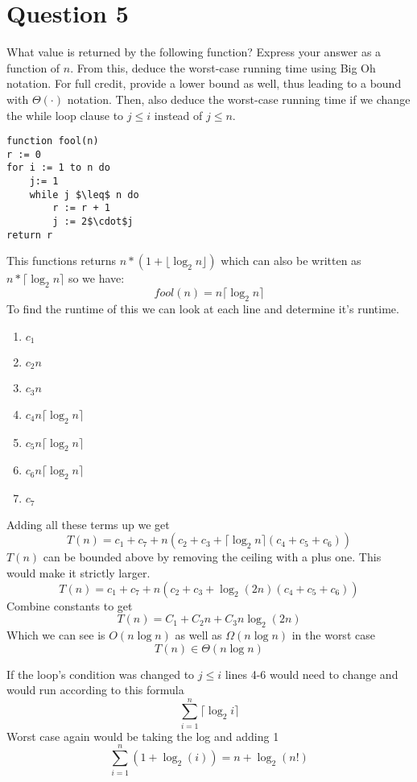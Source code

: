 \documentclass{article}
\begin{document}
\section*{Question 5}
What value is returned by the following function? Express your answer as a function of $n$.
From this, deduce the worst-case running time using Big Oh notation.
For full credit, provide a lower bound as well, thus leading to a bound with $\Theta(\cdot)$ notation.
Then, also deduce the worst-case running time if we change the while loop clause to $j \leq i$ instead of $j \leq n$.
\begin{lstlisting}
function fool(n)
r := 0
for i := 1 to n do
    j:= 1
    while j $\leq$ n do
        r := r + 1
        j := 2$\cdot$j
return r
\end{lstlisting}

This functions returns $n*(1+\lfloor \log_{2}n \rfloor)$ which can also be written as $n*\lceil \log_{2}n \rceil$ so we have:
$$fool(n)=n\lceil \log_{2}n \rceil$$
To find the runtime of this we can look at each line and determine it's runtime.

\begin{enumerate}

\item $c_{1}$
\item $c_{2}n$
\item $c_{3}n$
\item $c_{4}n\lceil \log_{2}n \rceil$
\item $c_{5}n\lceil \log_{2}n \rceil$
\item $c_{6}n\lceil \log_{2}n \rceil$
\item $c_{7}$

\end{enumerate}
Adding all these terms up we get
$$T(n) = c_{1}+c_{7} + n(c_{2} + c_{3}+\lceil \log_{2}n \rceil(c_{4} + c_{5} + c_{6}))$$
$T(n)$ can be bounded above by removing the ceiling with a plus one. This would make it strictly larger.
$$T(n) = c_{1}+c_{7} + n(c_{2} + c_{3}+\log_{2}(2n)(c_{4} + c_{5} + c_{6}))$$
Combine constants to get
$$T(n) = C_{1} + C_{2}n+C_{3}n\log_{2}(2n)$$
Which we can see is $O(n \log n)$ as well as $\Omega(n \log n)$ in the worst case
$$T(n) \in \Theta (n \log n)$$

If the loop's condition was changed to $ j \leq i$ lines 4-6 would need to change and would run according to this formula
$$\sum_{i=1}^{n}\lceil \log_{2}i \rceil$$
Worst case again would be taking the log and adding 1
$$\sum_{i=1}^{n} (1 + \log_{2}(i)) = n + \log_{2}(n!)$$
\end{document}
